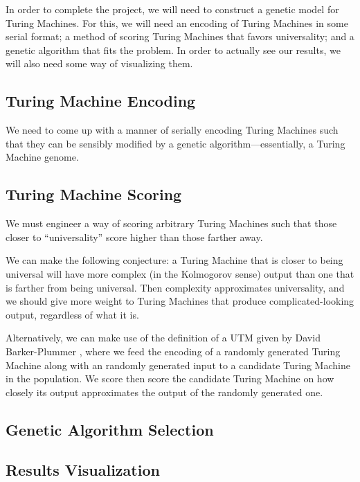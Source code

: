 In order to complete the project, we will need to construct a genetic
model for Turing Machines. For this, we will need an encoding of Turing
Machines in some serial format; a method of scoring Turing Machines that
favors universality; and a genetic algorithm that fits the problem. In
order to actually see our results, we will also need some way of
visualizing them.

\subsection{Turing Machine Encoding} 

We need to come up with a manner of serially encoding Turing Machines
such that they can be sensibly modified by a genetic
algorithm---essentially, a Turing Machine genome.

\subsection{Turing Machine Scoring} 

We must engineer a way of scoring arbitrary Turing Machines such that those
closer to ``universality'' score higher than those farther away.

We can make the following conjecture: a Turing Machine that is closer to
being universal will have more complex (in the Kolmogorov sense) output
than one that is farther from being universal. Then complexity
approximates universality, and we should give more weight to Turing
Machines that produce complicated-looking output, regardless of what it
is.

Alternatively, we can make use of the definition of a UTM given by David Barker-Plummer \cite{SEP_turing}, where we feed the encoding of a randomly generated Turing Machine along with an randomly generated input to a candidate Turing Machine in the population. We score then score the candidate Turing Machine on how closely its output approximates the output of the randomly generated one.

\subsection{Genetic Algorithm Selection}
\subsection{Results Visualization}
